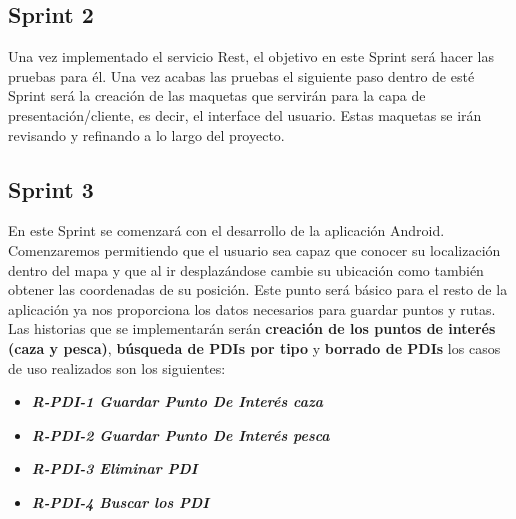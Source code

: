 \subsection{Sprint 2}
 Una vez implementado el servicio Rest, el objetivo en este Sprint será hacer las pruebas para él.
 Una vez acabas las pruebas el siguiente paso dentro de esté Sprint será la creación de las maquetas que servirán para la capa de presentación/cliente, es decir, el interface del usuario. Estas maquetas se irán revisando y refinando a lo largo del proyecto.
 
\subsection{Sprint 3}

En este Sprint se comenzará con el desarrollo de la aplicación Android. Comenzaremos permitiendo que el usuario sea capaz que conocer su localización dentro del mapa y que al ir desplazándose cambie su ubicación como también obtener las coordenadas de su posición. Este punto será básico para el resto de la aplicación ya nos proporciona los datos necesarios para guardar puntos y rutas. Las historias que se implementarán serán \textbf{creación de los puntos de interés (caza y pesca)},\textbf{ búsqueda de PDIs por tipo} y \textbf{borrado de PDIs} los casos de uso realizados son los siguientes:

\begin{itemize}

\item\textbf{\textit{ R-PDI-1 Guardar Punto De Interés caza}}
\item\textit{ \textbf{R-PDI-2 Guardar Punto De Interés pesca}}
\item \textbf{\textit{R-PDI-3 Eliminar PDI}}
\item \textbf{\textit{R-PDI-4 Buscar los PDI}}
\end{itemize} 


